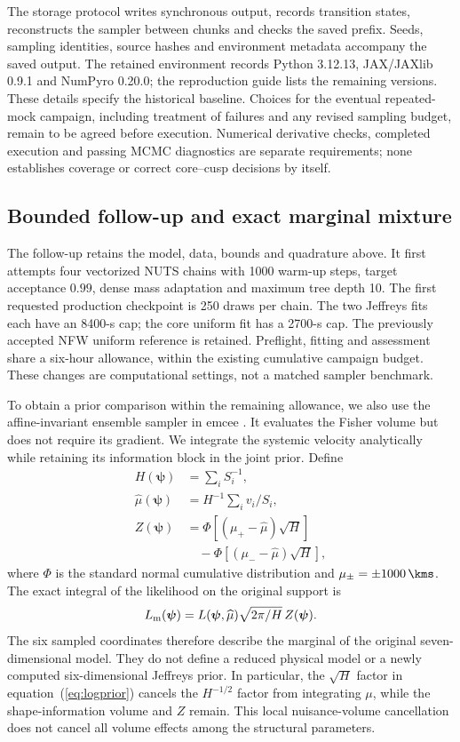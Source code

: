 The storage protocol writes synchronous  output, records transition states, reconstructs the sampler between chunks and checks the saved prefix. Seeds, sampling identities, source hashes and environment metadata accompany the saved output. The retained environment records Python 3.12.13, JAX/JAXlib 0.9.1 and NumPyro 0.20.0; the reproduction guide lists the remaining versions. These details specify the historical baseline. Choices for the eventual repeated-mock campaign, including treatment of failures and any revised sampling budget, remain to be agreed before execution. Numerical derivative checks, completed execution and passing MCMC diagnostics are separate requirements; none establishes coverage or correct core--cusp decisions by itself.

\subsection{Bounded follow-up and exact marginal mixture}
\label{sec:mixture}
The follow-up retains the model, data, bounds and quadrature above. It first attempts four vectorized NUTS chains with 1000 warm-up steps, target acceptance $0.99$, dense mass adaptation and maximum tree depth 10. The first requested production checkpoint is 250 draws per chain. The two Jeffreys fits each have an 8400-s cap; the core uniform fit has a 2700-s cap. The previously accepted NFW uniform reference is retained. Preflight, fitting and assessment share a six-hour allowance, within the existing cumulative campaign budget. These changes are computational settings, not a matched sampler benchmark.

To obtain a prior comparison within the remaining allowance, we also use the affine-invariant ensemble sampler in emcee \citep{foremanmackey2013}. It evaluates the Fisher volume but does not require its gradient. We integrate the systemic velocity analytically while retaining its information block in the joint prior. Define
\begin{align}
 H(\boldsymbol\psi)&=\sum_i S_i^{-1},\\
 \widehat\mu(\boldsymbol\psi)&=H^{-1}\sum_i v_i/S_i,\\
 Z(\boldsymbol\psi)&=\Phi[(\mu_+-\widehat\mu)\sqrt H]\nonumber\\
                 &\quad-\Phi[(\mu_--\widehat\mu)\sqrt H],
\end{align}
where $\Phi$ is the standard normal cumulative distribution and $\mu_\pm=\pm1000\,\kms$. The exact integral of the likelihood on the original support is
\begin{equation}
 L_{\rm m}(\boldsymbol\psi)=L(\boldsymbol\psi,\widehat\mu)
                         \sqrt{2\pi/H}\,Z(\boldsymbol\psi).
 \label{eq:marginal}
\end{equation}
The six sampled coordinates therefore describe the marginal of the original seven-dimensional model. They do not define a reduced physical model or a newly computed six-dimensional Jeffreys prior. In particular, the $\sqrt H$ factor in equation~(\ref{eq:logprior}) cancels the $H^{-1/2}$ factor from integrating $\mu$, while the shape-information volume and $Z$ remain. This local nuisance-volume cancellation does not cancel all volume effects among the structural parameters.

